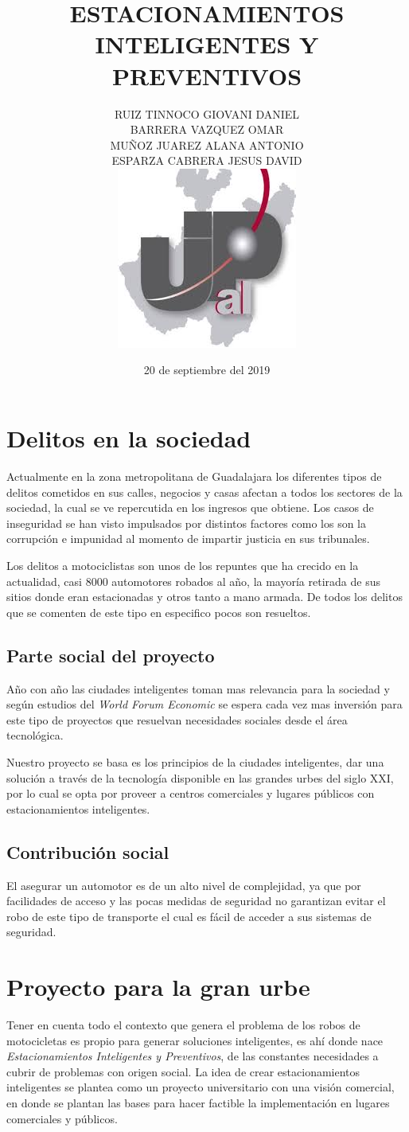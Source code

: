 \documentclass[11pt]{article}
\date{20 de septiembre del 2019}
\title{\textbf{ESTACIONAMIENTOS INTELIGENTES Y PREVENTIVOS}}
\author{RUIZ TINNOCO GIOVANI DANIEL\\
		BARRERA VAZQUEZ OMAR\\
		MUÑOZ JUAREZ ALANA ANTONIO\\
		ESPARZA CABRERA JESUS DAVID\\		
\includegraphics[scale=2]{ImagenesDoc/p1.jpg} 
}
\begin{document}
\maketitle
\newpage
\section{Delitos en la sociedad}
Actualmente en la zona metropolitana de Guadalajara los diferentes tipos de delitos cometidos en sus calles, negocios y casas afectan a todos los sectores de la sociedad, la cual se ve repercutida en los ingresos que obtiene.
Los casos de inseguridad se han visto impulsados por distintos factores como los son la corrupción e impunidad al momento de impartir justicia en sus tribunales.

  Los delitos a motociclistas son unos de los repuntes que ha crecido en la actualidad, casi 8000 automotores robados al año, la mayoría retirada de sus sitios donde eran estacionadas y otros tanto a mano armada. De todos los delitos que se comenten de este tipo en especifico pocos son resueltos.
  
\subsection{Parte social del proyecto}

Año con año las ciudades inteligentes toman mas relevancia para la sociedad y según estudios del \emph{World Forum Economic} se espera cada vez mas inversión para este tipo de proyectos que resuelvan necesidades sociales desde el área tecnológica.

Nuestro proyecto se basa es los principios de la ciudades inteligentes, dar una solución a través de la tecnología disponible en las grandes urbes del siglo XXI, por lo cual se opta por proveer a centros comerciales y lugares públicos con estacionamientos inteligentes.

\subsection{Contribución social}
El asegurar un automotor es de un alto nivel de complejidad, ya que por facilidades de acceso y las pocas medidas de seguridad no garantizan evitar el robo de este tipo de transporte el cual es fácil de acceder a sus sistemas de seguridad.

\section{Proyecto para la gran urbe}
Tener en cuenta todo el contexto que genera el problema de los robos de motocicletas es propio para generar soluciones inteligentes, es ahí donde nace \emph{Estacionamientos Inteligentes y Preventivos}, de las constantes necesidades a cubrir de problemas con origen social. La idea de crear estacionamientos inteligentes se plantea como un proyecto universitario con una visión comercial, en donde se plantan las bases para hacer factible la implementación en lugares comerciales y públicos.
\end{document}
